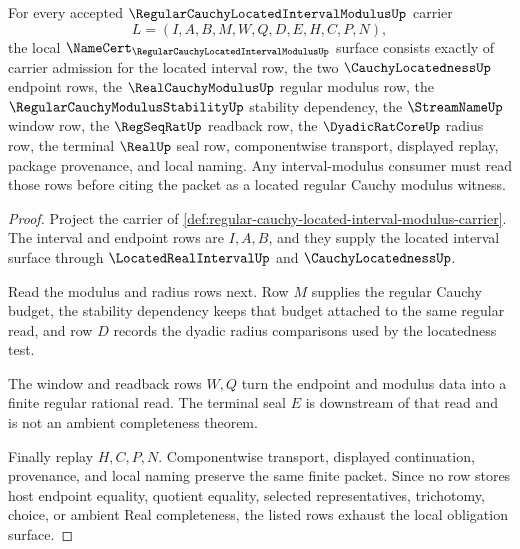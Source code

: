 \begin{theorem}
\label{thm:regular-cauchy-located-interval-modulus-obligations}
For every accepted $\RegularCauchyLocatedIntervalModulusUp$ carrier
$$
L=(I,A,B,M,W,Q,D,E,H,C,P,N),
$$
the local $\NameCert_{\RegularCauchyLocatedIntervalModulusUp}$ surface consists exactly of carrier admission for the located interval row, the two $\CauchyLocatednessUp$ endpoint rows, the $\RealCauchyModulusUp$ regular modulus row, the $\RegularCauchyModulusStabilityUp$ stability dependency, the $\StreamNameUp$ window row, the $\RegSeqRatUp$ readback row, the $\DyadicRatCoreUp$ radius row, the terminal $\RealUp$ seal row, componentwise transport, displayed replay, package provenance, and local naming. Any interval-modulus consumer must read those rows before citing the packet as a located regular Cauchy modulus witness.
\end{theorem}
\begin{proof}
Project the carrier of \autoref{def:regular-cauchy-located-interval-modulus-carrier}. The interval and endpoint rows are $I,A,B$, and they supply the located interval surface through $\LocatedRealIntervalUp$ and $\CauchyLocatednessUp$.

Read the modulus and radius rows next. Row $M$ supplies the regular Cauchy budget, the stability dependency keeps that budget attached to the same regular read, and row $D$ records the dyadic radius comparisons used by the locatedness test.

The window and readback rows $W,Q$ turn the endpoint and modulus data into a finite regular rational read. The terminal seal $E$ is downstream of that read and is not an ambient completeness theorem.

Finally replay $H,C,P,N$. Componentwise transport, displayed continuation, provenance, and local naming preserve the same finite packet. Since no row stores host endpoint equality, quotient equality, selected representatives, trichotomy, choice, or ambient Real completeness, the listed rows exhaust the local obligation surface.
\end{proof}


